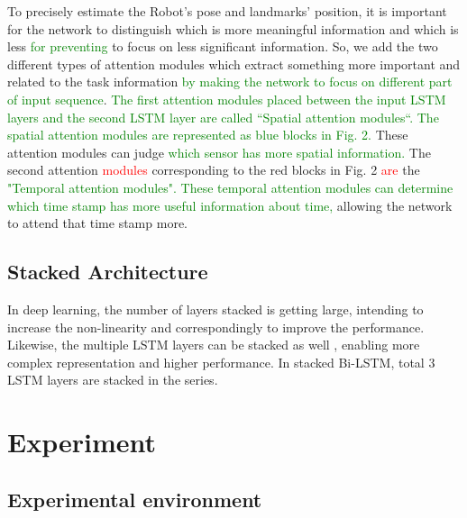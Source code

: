 \documentclass[letterpaper, 10 pt, conference]{ieeeconf}  %
\begin{document}
To precisely estimate the Robot’s pose and landmarks’ position, it is important for the network to distinguish which is more meaningful information and which is less \textcolor{green}{for preventing} to focus on less significant information. So, we add the two different types of attention modules \cite{luong2015effective} which extract something more important and related to the task information \textcolor{green}{by making the network to focus on different part of input sequence}. \textcolor{green}{The first attention modules placed between the input LSTM layers and the second LSTM layer are called “Spatial attention modules“. The spatial attention modules are represented as blue blocks in Fig. 2.} These attention modules can judge \textcolor{green}{which sensor has more spatial information.} The second attention \textcolor{red}{modules} corresponding to the red blocks in Fig. 2 \textcolor{red}{are} the \textcolor{green}{"Temporal attention modules". These temporal attention modules can determine which time stamp has more useful information about time,} allowing the network to attend that time stamp more.  

\subsection{Stacked Architecture}

In deep learning, the number of layers stacked is getting large, intending to increase the non-linearity and correspondingly to improve the performance. Likewise, the multiple LSTM layers can be stacked as well \cite{dyer2015transition}, enabling more complex representation and higher performance. In stacked Bi-LSTM, total 3 LSTM layers are stacked in the series. 


\section{Experiment}


\subsection{Experimental environment} 
\end{document}
